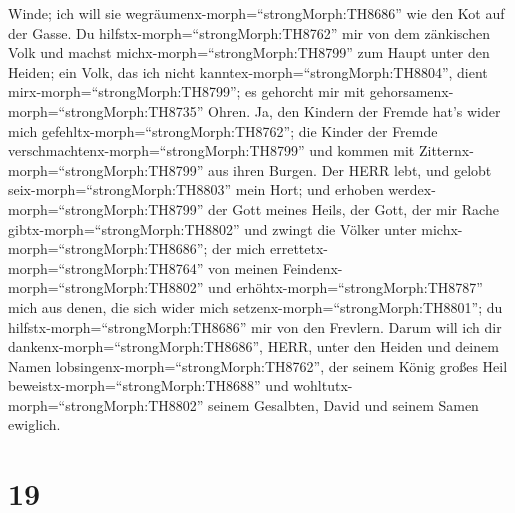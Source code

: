 Winde; ich will sie wegräumenx-morph=``strongMorph:TH8686'' wie den Kot
auf der Gasse.  Du hilfstx-morph=``strongMorph:TH8762'' mir
von dem zänkischen Volk und machst michx-morph=``strongMorph:TH8799''
zum Haupt unter den Heiden; ein Volk, das ich nicht
kanntex-morph=``strongMorph:TH8804'', dient
mirx-morph=``strongMorph:TH8799'';  es gehorcht mir mit
gehorsamenx-morph=``strongMorph:TH8735'' Ohren. Ja, den Kindern der
Fremde hat's wider mich gefehltx-morph=``strongMorph:TH8762'';
 die Kinder der Fremde
verschmachtenx-morph=``strongMorph:TH8799'' und kommen mit
Zitternx-morph=``strongMorph:TH8799'' aus ihren Burgen. 
Der HERR lebt, und gelobt seix-morph=``strongMorph:TH8803'' mein Hort;
und erhoben werdex-morph=``strongMorph:TH8799'' der Gott meines Heils,
 der Gott, der mir Rache gibtx-morph=``strongMorph:TH8802''
und zwingt die Völker unter michx-morph=``strongMorph:TH8686'';
 der mich errettetx-morph=``strongMorph:TH8764'' von meinen
Feindenx-morph=``strongMorph:TH8802'' und
erhöhtx-morph=``strongMorph:TH8787'' mich aus denen, die sich wider mich
setzenx-morph=``strongMorph:TH8801''; du
hilfstx-morph=``strongMorph:TH8686'' mir von den Frevlern. 
Darum will ich dir dankenx-morph=``strongMorph:TH8686'', HERR, unter den
Heiden und deinem Namen lobsingenx-morph=``strongMorph:TH8762'',
 der seinem König großes Heil
beweistx-morph=``strongMorph:TH8688'' und
wohltutx-morph=``strongMorph:TH8802'' seinem Gesalbten, David und seinem
Samen ewiglich.

\hypertarget{section-18}{%
\section{19}\label{section-18}}

